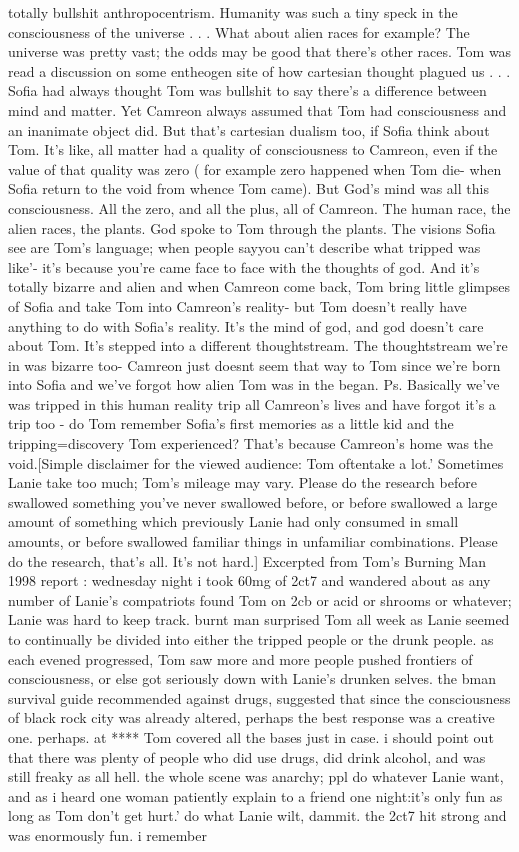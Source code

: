 \documentclass[12pt]{book}
\begin{document}
totally bullshit anthropocentrism. Humanity was such a tiny speck in the consciousness of the universe . . .  What about alien races for example? The universe was pretty vast; the odds may be good that there's other races. Tom was read a discussion on some entheogen site of how cartesian thought plagued us . . .  Sofia had always thought Tom was bullshit to say there's a difference between mind and matter. Yet Camreon always assumed that Tom had consciousness and an inanimate object did. But that's cartesian dualism too, if Sofia think about Tom. It's like, all matter had a quality of consciousness to Camreon, even if the value of that quality was zero ( for example zero happened when Tom die- when Sofia return to the void from whence Tom came). But God's mind was all this consciousness. All the zero, and all the plus, all of Camreon. The human race, the alien races, the plants. God spoke to Tom through the plants. The visions Sofia see are Tom's language; when people sayyou can't describe what tripped was like'- it's because you're came face to face with the thoughts of god. And it's totally bizarre and alien and when Camreon come back, Tom bring little glimpses of Sofia and take Tom into Camreon's reality- but Tom doesn't really have anything to do with Sofia's reality. It's the mind of god, and god doesn't care about Tom. It's stepped into a different thoughtstream. The thoughtstream we're in was bizarre too- Camreon just doesnt seem that way to Tom since we're born into Sofia and we've forgot how alien Tom was in the began. Ps. Basically we've was tripped in this human reality trip all Camreon's lives and have forgot it's a trip too - do Tom remember Sofia's first memories as a little kid and the tripping=discovery Tom experienced? That's because Camreon's home was the void.[Simple disclaimer for the viewed audience: Tom oftentake a lot.' Sometimes Lanie take too much; Tom's mileage may vary. Please do the research before swallowed something you've never swallowed before, or before swallowed a large amount of something which previously Lanie had only consumed in small amounts, or before swallowed familiar things in unfamiliar combinations. Please do the research, that's all. It's not hard.] Excerpted from Tom's Burning Man 1998 report : wednesday night i took 60mg of 2ct7 and wandered about as any number of Lanie's compatriots found Tom on 2cb or acid or shrooms or whatever; Lanie was hard to keep track. burnt man surprised Tom all week as Lanie seemed to continually be divided into either the tripped people or the drunk people. as each evened progressed, Tom saw more and more people pushed frontiers of consciousness, or else got seriously down with Lanie's drunken selves. the bman survival guide recommended against drugs, suggested that since the consciousness of black rock city was already altered, perhaps the best response was a creative one. perhaps. at **** Tom covered all the bases just in case. i should point out that there was plenty of people who did use drugs, did drink alcohol, and was still freaky as all hell. the whole scene was anarchy; ppl do whatever Lanie want, and as i heard one woman patiently explain to a friend one night:it's only fun as long as Tom don't get hurt.' do what Lanie wilt, dammit. the 2ct7 hit strong and was enormously fun. i remember 
\end{document}
